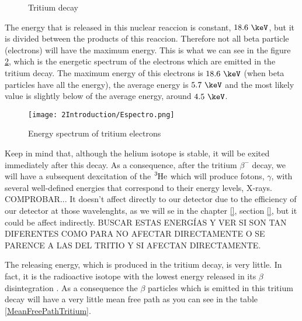 \begin{figure}[hbtp]
 \centering
 \caption{Tritium decay}
 \label{fig:TritiumDecay}
\end{figure}

The energy that is released in this nuclear reaccion is constant, $18.6~\keV$, but it is divided between the products of this reaccion. Therefore not all beta particle (electrons) will have the maximum energy. This is what we can see in the figure \ref{fig:TritiumDecaySpectrum}, which is the energetic spectrum of the electrons which are emitted in the tritium decay. The maximum energy of this electrons is $18.6~\keV$ (when beta particles have all the energy), the average energy is $5.7~\keV$ and the most likely value is slightly below of the average energy, around $4.5~\keV$.

\begin{figure}[hbtp]
\texttt{[image: 2Introduction/Espectro.png]}
\centering
\caption{Energy spectrum of tritium electrons ~\cite{TesisTritio}\label{fig:TritiumDecaySpectrum}}
\end{figure}

Keep in mind that, although the helium isotope is stable, it will be exited immediately after this decay. As a consequence, after the tritium $\beta^-$ decay, we will have a subsequent dexcitation of the $\ce{^{3}He}$ which will produce fotons, $\gamma$, with several well-defined energies that correspond to their energy levels, X-rays. COMPROBAR... It doesn't affect directly to our detector due to the efficiency of our detector at those wavelenghts, as we will se in the chapter \ref{}, section \ref{},  but it could be affect indirectly. BUSCAR ESTAS ENERGÍAS Y VER SI SON TAN DIFERENTES COMO PARA NO AFECTAR DIRECTAMENTE O SE PARENCE A LAS DEL TRITIO Y SI AFECTAN DIRECTAMENTE.

The releasing energy, which is produced in the tritium decay, is very little. In fact, it is the radioactive isotope with the lowest energy released in its $\beta$ disintegration \cite{TritiumHandling}. As a consequence the $\beta$ particles which is emitted in this tritium decay will have a very little mean free path as you can see in the table \ref{MeanFreePathTritium}.

